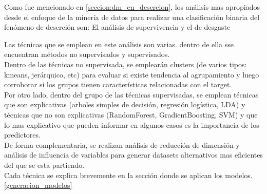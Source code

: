 

Como fue mencionado en \ref{seccion:dm_en_desercion}, los análisis mas apropiados desde el enfoque de la minería de datos para realizar una clasificación binaria del fenómeno de deserción son: El análisis de supervivencia y el de desgaste \cite{PredictModel-GarciaVellidoNebot}


Las técnicas que se emplean en este análisis son varias. dentro de ella sse encuentran métodos no supervisados y supervisados.\\
Dentro de las técnicas no supervisada, se emplearán clusters (de varios tipos: kmeans, jerárquico, etc) para evaluar si existe tendencia al agrupamiento y luego corroborar si los grupos tienen características relacionadas con el target. \\
Por otro lado, dentro del grupo de las técnicas supervisadas, se emplean técnicas que son explicativas (arboles simples de decisión, regresión logística, LDA) y técnicas que no son explicativas (RandomForest, GradientBoosting, SVM) y que lo mas explicativo que pueden informar en algunos casos es la importancia de los predictores.\\

De forma complementaria, se realizan análisis de reducción de dimensión y análisis de influencia de variables para generar datasets alternativos mas eficientes del que se esta partiendo.\\

Cada técnica se explica brevemente en la sección donde se aplican los modelos.\ref{generacion_modelos}

